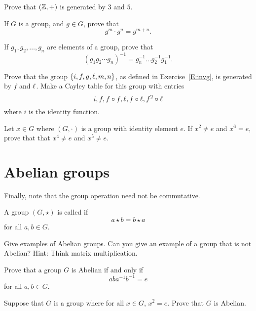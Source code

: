 \documentclass{ximera}
\begin{document}
\begin{exercise}
  Prove that $(\mathbb Z,+)$ is generated by $3$ and $5$.
\end{exercise}

\begin{exercise}
  If $G$ is a group, and $g\in G$, prove that
  \[
  g^m\cdot g^n = g^{m+n}.
  \]
\end{exercise}


\begin{exercise}
  If $g_1,g_2,\dots, g_n$ are elements of a group, prove that
  \[
  (g_1g_2\cdots g_n)^{-1} = g_n^{-1}\dots g_2^{-1}g_1^{-1}.
  \]
\end{exercise}


\begin{exercise}
  Prove that the group $\{i,f,g,\ell,m,n\}$, as defined in
  Exercise~\ref{E:invg}, is generated by $f$ and $\ell$. Make a Cayley
  table for this group with entries
  \[
  i, f, f\circ f, \ell, f\circ \ell,f^2\circ \ell
  \]
  where $i$ is the identity function.
\end{exercise}

\begin{exercise}
  Let $x \in G$ where $(G,\cdot)$ is a group with identity element
  $e$. If $x^2 \ne e$ and $x^6 = e$, prove that that $x^4 \ne e$ and
  $x^5 \ne e$.
\end{exercise}


\section{Abelian groups}


Finally, note that the group operation need not be commutative.

\begin{definition}
  A group $(G,\star)$ is called  if
  \[
  a\star b = b\star a
  \]
  for all $a,b\in G$.
\end{definition}

\begin{exercise}
  Give examples of Abelian groups. Can you give an example of a group
  that is not Abelian? Hint: Think matrix multiplication.
\end{exercise}

\begin{exercise}
  Prove that a group $G$ is Abelian if and only if
  \[
  aba^{-1}b^{-1} = e
  \]
  for all $a,b\in G$.
\end{exercise}


\begin{exercise}
  Suppose that $G$ is a group where for all $x\in G$, $x^2 =e$. Prove
  that $G$ is Abelian.
\end{exercise}
\end{document}
